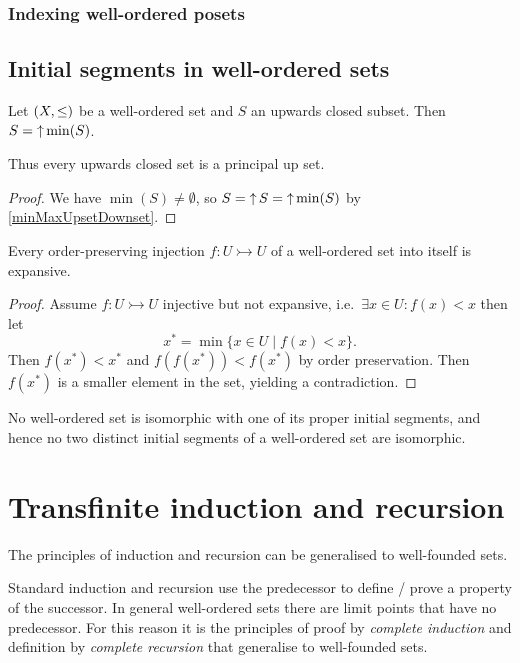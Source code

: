 \subsubsection{Indexing well-ordered posets}


\subsection{Initial segments in well-ordered sets}
\begin{proposition}
Let $\sSet{X,\leq}$ be a well-ordered set and $S$ an upwards closed subset. Then $S = \operatorname{\uparrow}\min(S)$.

Thus every upwards closed set is a principal up set.
\end{proposition}
\begin{proof}
We have $\min(S) \neq\emptyset$, so $S = \operatorname{\uparrow} S = \operatorname{\uparrow}\min(S)$ by \ref{minMaxUpsetDownset}.
\end{proof}

\begin{proposition} \label{injectionsExpansive}
Every order-preserving injection $f: U\rightarrowtail U$ of a well-ordered set into itself is expansive.
\end{proposition}
\begin{proof}
Assume $f: U\rightarrowtail U$ injective but not expansive, i.e.\ $\exists x\in U: f(x)<x$ then let
\[ x^* = \min\{x\in U\;|\;f(x)<x\}. \]
Then $f(x^*)<x^*$ and $f(f(x^*)) < f(x^*)$ by order preservation. Then $f(x^*)$ is a smaller element in the set, yielding a contradiction.
\end{proof}
\begin{corollary} \label{properInitialSegmentNotIsomorphic}
No well-ordered set is isomorphic with one of its proper initial
segments, and hence no two distinct initial segments of a well-ordered set are
isomorphic.
\end{corollary}

\section{Transfinite induction and recursion}
The principles of induction and recursion can be generalised to well-founded sets.

Standard induction and recursion use the predecessor to define / prove a property of the successor. In general well-ordered sets there are limit points that have no predecessor. For this reason it is the principles of proof by \textit{complete
induction} and definition by \textit{complete recursion} that generalise to well-founded sets.

